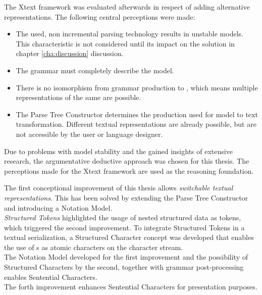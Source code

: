 The Xtext framework was evaluated afterwards in respect of adding alternative representations.
The following central perceptions were made:
\begin{itemize}
	\item The used, non incremental parsing technology results in unstable models. This characteristic is not considered until its impact on the solution in chapter \ref{cha:discussion} discussion.
	\item The grammar must completely describe the model. 
	\item There is no isomorphism from grammar production to , which means multiple representations of the same  are possible.
	\item The Parse Tree Constructor determines the production used for model to text transformation. Different textual representations are already possible, but are not accessible by the user or language designer. \\
\end{itemize}

Due to problems with model stability and the gained insights of extensive research, the argumentative deductive approach was chosen for this thesis. The perceptions made for the Xtext framework are used as the reasoning foundation. 

The first conceptional improvement of this thesis allows \emph{switchable textual representations}. This has been solved by extending the Parse Tree Constructor and introducing a Notation Model.\\

\emph{Structured Tokens} highlighted the usage of nested structured data as tokens, which triggered the second improvement. To integrate Structured Tokens in a textual serialization, a Structured Character concept was developed that enables the use of s as atomic characters on the character stream. \\

The Notation Model developed for the first improvement and the possibility of Structured Characters by the second, together with grammar post-processing enables Sentential Characters. \\

The forth improvement enhances Sentential Characters for presentation purposes.
